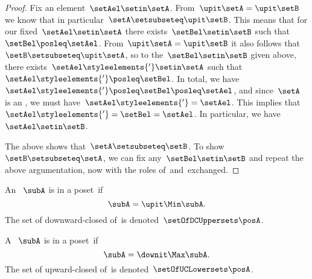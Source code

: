 \begin{proof}
    Fix an element~$\setAel \setin \setA$.
    From~$\upit \setA = \upit \setB$ we know that in particular~$\setA \setsubseteq \upit \setB$.
    This means that for our fixed~$\setAel \setin \setA$ there exists~$\setBel \setin \setB$ such that~$\setBel \posleq \setAel$.
    From~$\upit \setA = \upit \setB$ it also follows that~$\setB \setsubseteq \upit \setA$, so to the~$\setBel \setin \setB$ given above, there exists~$\setAel\styleelements{'} \setin \setA$ such that~$\setAel\styleelements{'} \posleq \setBel$.
    In total, we have~$\setAel\styleelements{'} \posleq \setBel \posleq \setAel$, and since~$\setA$ is an , we must have~$\setAel\styleelements{'} = \setAel$.
    This implies that~$\setAel\styleelements{'} = \setBel = \setAel$.
    In particular, we have~$\setAel \setin \setB$.

    The above shows that~$\setA \setsubseteq \setB$.
    To show~$\setB \setsubseteq \setA$, we can fix any~$\setBel \setin \setB$ and repeat the above argumentation, now with the roles of~\setA and~\setB exchanged.
\end{proof}

\begin{definition}
    \label{def:downward-closed-upperset}
    An ~$\subA$ is  in a poset~\posA if
    \begin{equation}
        \subA = \upit \Min \subA.
    \end{equation}
    The set of downward-closed  of~\posA is denoted~$\setOfDCUppersets \posA$.

\end{definition}

\begin{definition}
    \label{def:upward-closed-lowerset}
    A ~$\subA$ is  in a poset~\posA if
    \begin{equation}
        \subA = \downit \Max \subA.
    \end{equation}
    The set of upward-closed  of~\posA is denoted~$\setOfUCLowersets \posA$.
\end{definition}
